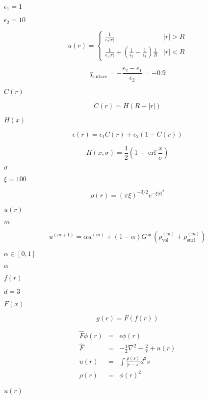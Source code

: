 \documentclass{article}
\begin{document}
$\epsilon_1 = 1$
\pagebreak

$\epsilon_2 = 10$
\pagebreak

\[
   u(r) =
          \left \lbrace
             \begin{array}{cc}
                  \frac{1}{\epsilon_2 |r|} & |r| > R \\
                  \frac{1}{\epsilon_1 |r|} + \left( \frac{1}{\epsilon_2} - \frac{1}{\epsilon_1} \right) \frac{1}{R}  & |r| < R
             \end{array}
          \right .
\]
\pagebreak

\[
   q_{\mbox{surface}} = -\frac{\epsilon_2 - \epsilon_1}{\epsilon_2} = -0.9
\]
\pagebreak

$C(r)$
\pagebreak

\[
  C(r) = H(R-|r|)
\]
\pagebreak

$H(x)$
\pagebreak

\[
   \epsilon(r) = \epsilon_1 C(r) + \epsilon_2 \left( 1 - C(r) \right)
\]
\pagebreak

\[
   H(x,\sigma) = \frac{1}{2} \left( 1 + \mathop{\mathrm{erf}} \frac{x}{\sigma} \right)
\]
\pagebreak

$\sigma$
\pagebreak

$\xi=100$
\pagebreak

\[
   \rho(r) = \left(\pi \xi \right)^{-3/2} e^{-\xi |r|^2}
\]
\pagebreak

$u(r)$
\pagebreak

$m$
\pagebreak

\[
   u^{(m+1)} = \alpha u^{(m)} + (1-\alpha) G * \left(\rho^{(m)}_{\mbox{vol}} + \rho^{(m)}_{\mbox{surf}} \right)
\]
\pagebreak

$ \alpha \in [0,1]$
\pagebreak

$\alpha$
\pagebreak

$f(r)$
\pagebreak

$d=3$
\pagebreak

$F(x)$
\pagebreak

\[
    g(r) = F(f(r))
\]
\pagebreak

\begin{eqnarray*}
   \hat{F} \phi(r) &=& \epsilon \phi(r) \\
   \hat{F} &=& -\frac{1}{2} \nabla^2 - \frac{2}{r} + u(r) \\
   u(r) &=& \int \frac{\rho(s)}{| r - s |} d^3s \\
   \rho(r) &=& \phi(r)^2
\end{eqnarray*}
\pagebreak

$ u(r) $
\pagebreak
\end{document}

